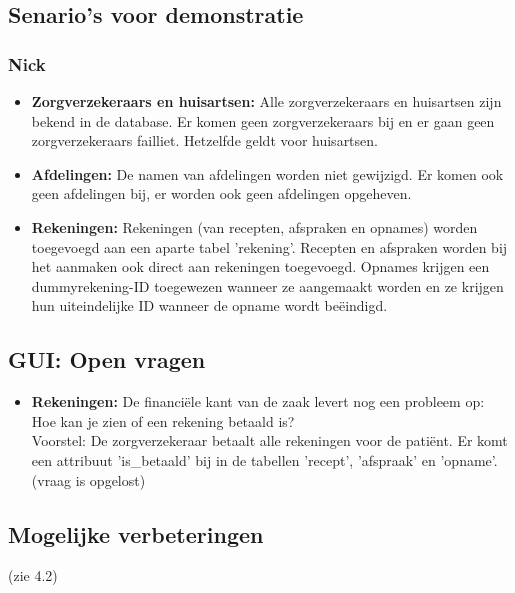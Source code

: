 
\subsection*{Senario's voor demonstratie}
\subsubsection*{Nick}
\begin{itemize}
\item \textbf{Zorgverzekeraars en huisartsen:} Alle zorgverzekeraars en huisartsen zijn bekend in de
database. Er komen geen zorgverzekeraars bij en er gaan geen
zorgverzekeraars failliet. Hetzelfde geldt voor huisartsen.

\item \textbf{Afdelingen:} De namen van afdelingen worden niet gewijzigd. Er komen ook
geen afdelingen bij, er worden ook geen afdelingen opgeheven.

\item \textbf{Rekeningen:} Rekeningen (van recepten, afspraken en opnames) worden toegevoegd aan een aparte tabel
'rekening'. Recepten en afspraken worden bij het aanmaken ook direct
aan rekeningen toegevoegd. Opnames krijgen een dummyrekening-ID
toegewezen wanneer ze aangemaakt worden en ze krijgen hun
uiteindelijke ID wanneer de opname wordt be\"eindigd.
\end{itemize}

\subsection*{GUI: Open vragen}
\begin{itemize}
\item \textbf{Rekeningen:} De financi\"ele kant van de zaak levert nog een probleem op: Hoe
kan je zien of een rekening betaald is?\\
Voorstel: De zorgverzekeraar betaalt alle rekeningen voor de
pati\"ent. Er komt een attribuut 'is\_betaald' bij in de tabellen
'recept', 'afspraak' en 'opname'. (vraag is opgelost)
\end{itemize}
\subsection*{Mogelijke verbeteringen}
(zie 4.2)
